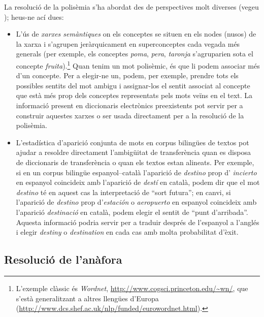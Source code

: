 La resolució de la polisèmia s'ha abordat des de perspectives molt
diverses (vegeu \citet{ide98j}); heus-ne ací dues:
\begin{itemize}
\item L'ús de \emph{xarxes semàntiques} on els conceptes se situen en
  els nodes (nusos) de la xarxa i s'agrupen jeràrquicament en
  superconceptes cada vegada més generals (per exemple, els conceptes
  \emph{poma}, \emph{pera}, \emph{taronja} s'agruparien sota el
  concepte \emph{fruita}).\footnote{L'exemple clàssic és
    \emph{Wordnet}, \url{http://www.cogsci.princeton.edu/~wn/},
    que s'està generalitzant a altres llengües d'Europa
    (\url{http://www.dcs.shef.ac.uk/nlp/funded/eurowordnet.html}).}
  Quan tenim un mot polisèmic, és que li podem associar més d'un
  concepte. Per a elegir-ne un, podem, per exemple, prendre tots els
  possibles sentits del mot ambigu i assignar-los el sentit associat
  al concepte que està més prop dels conceptes representats pels mots
  veïns en el text.  La informació present en diccionaris electrònics
  preexistents pot servir per a construir aquestes xarxes o ser usada
  directament per a la resolució de la polisèmia.
\item L'estadística d'aparició conjunta de mots en corpus bilingües de
  textos pot ajudar a resoldre directament l'ambigüitat de
  transferència quan es disposa de diccionaris de transferència o quan
  els textos estan alineats. Per exemple, si en un corpus bilingüe
  espanyol--català l'aparició de \emph{destino} prop d'{\em
    incierto} en espanyol coincideix amb l'aparició de \emph{destí}
  en català, podem dir que el mot \emph{destino} té en aquest cas la interpretació de ``sort futura''; en canvi, si l'aparició de {\em
    destino} prop d'\emph{estación} o \emph{aeropuerto} en espanyol
  coincideix amb l'aparició \emph{destinació} en català, podem elegir
  el sentit de ``punt d'arribada''. Aquesta informació podria servir
  per a traduir després de l'espanyol a l'anglés i elegir {\em
    destiny} o \emph{destination} en cada cas amb molta
  probabilitat d'èxit.
\end{itemize}


\subsection{Resolució de l'anàfora}

